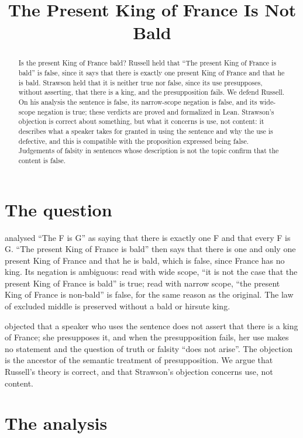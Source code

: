 \documentclass{situationist-preprint}
\title{The Present King of France Is Not Bald}
\begin{document}
\maketitle

\begin{abstract}
Is the present King of France bald? Russell held that \enquote{The present King of France is bald} is false, since it says that there is exactly one present King of France and that he is bald. Strawson held that it is neither true nor false, since its use presupposes, without asserting, that there is a king, and the presupposition fails. We defend Russell. On his analysis the sentence is false, its narrow-scope negation is false, and its wide-scope negation is true; these verdicts are proved and formalized in Lean. Strawson's objection is correct about something, but what it concerns is use, not content: it describes what a speaker takes for granted in using the sentence and why the use is defective, and this is compatible with the proposition expressed being false. Judgements of falsity in sentences whose description is not the topic confirm that the content is false.
\end{abstract}

\section{The question}

\citet{Russell1905} analysed \enquote{The F is G} as saying that there is exactly one F and that every F is G. \enquote{The present King of France is bald} then says that there is one and only one present King of France and that he is bald, which is false, since France has no king. Its negation is ambiguous: read with wide scope, \enquote{it is not the case that the present King of France is bald} is true; read with narrow scope, \enquote{the present King of France is non-bald} is false, for the same reason as the original. The law of excluded middle is preserved without a bald or hirsute king.

\citet{Strawson1950} objected that a speaker who uses the sentence does not assert that there is a king of France; she presupposes it, and when the presupposition fails, her use makes no statement and the question of truth or falsity \enquote{does not arise}. The objection is the ancestor of the semantic treatment of presupposition. We argue that Russell's theory is correct, and that Strawson's objection concerns use, not content.

\section{The analysis}
\end{document}

